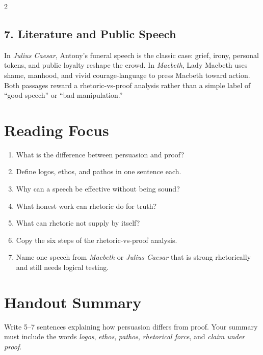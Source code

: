 \documentclass[12pt]{article}
\begin{document}
\begin{multicols}{2}
\subsection*{7. Literature and Public Speech}
In \textit{Julius Caesar}, Antony's funeral speech is the classic case: grief, irony, personal tokens, and public loyalty reshape the crowd. In \textit{Macbeth}, Lady Macbeth uses shame, manhood, and vivid courage-language to press Macbeth toward action. Both passages reward a rhetoric-vs-proof analysis rather than a simple label of ``good speech'' or ``bad manipulation.''

\section*{Reading Focus}
\begin{enumerate}[leftmargin=*]
\item What is the difference between persuasion and proof?
\item Define logos, ethos, and pathos in one sentence each.
\item Why can a speech be effective without being sound?
\item What honest work can rhetoric do for truth?
\item What can rhetoric not supply by itself?
\item Copy the six steps of the rhetoric-vs-proof analysis.
\item Name one speech from \textit{Macbeth} or \textit{Julius Caesar} that is strong rhetorically and still needs logical testing.
\end{enumerate}

\section*{Handout Summary}
Write 5--7 sentences explaining how persuasion differs from proof. Your summary must include the words \textit{logos}, \textit{ethos}, \textit{pathos}, \textit{rhetorical force}, and \textit{claim under proof}.
\end{multicols}
\end{document}
